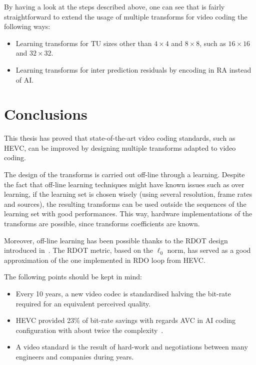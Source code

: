 \documentclass[11pt,a4paper,openright,twoside]{book}
\numberwithin{equation}{section} %
\numberwithin{figure}{section} %
\numberwithin{table}{section} %
\begin{document}
By having a look at the steps described above, one can see that is fairly
straightforward to extend the usage of multiple transforms for video coding
the following ways:
\begin{itemize}
	\item Learning transforms for \ac{TU} sizes other than $4\times4$ and
		$8\times8$, such as $16\times16$ and $32\times32$.
	\item Learning transforms for inter prediction residuals by encoding in
		\ac{RA} instead of \ac{AI}.
\end{itemize}

\section*{Conclusions}
\label{sec:final_conclusions}

This thesis has proved that state-of-the-art video coding standards, such as
\ac{HEVC}, can be improved by designing multiple transforms adapted to video
coding.

The design of the transforms is carried out off-line through a learning.
Despite the fact that off-line learning techniques might have known issues
such as over learning, if the learning set is chosen wisely (using several
resolution, frame rates and sources), the resulting transforms can be used
outside the sequences of the learning set with good performances.
This way, hardware implementations of the transforms are possible, since
transforms coefficients are known.

Moreover, off-line learning has been possible thanks to the \ac{RDOT} design
introduced in~\cite{sezer-08-sparse-orthonormal-transforms}.
The \ac{RDOT} metric, based on the $\ell_0$ norm, has served as a good
approximation of the one implemented in \ac{RDO} loop  from \ac{HEVC}.

The following points should be kept in mind:
\begin{itemize}
	\item Every 10 years, a new video codec is standardised halving the
		bit-rate required for an equivalent perceived quality.
	\item \acs{HEVC} provided 23\% of bit-rate savings with regards \acs{AVC}
		in \acs{AI} coding configuration with about twice the
		complexity~\cite{JCTVC-M0329}.
	\item A video standard is the result of hard-work and negotiations between
		many engineers and companies during years.
\end{itemize}
\end{document}
